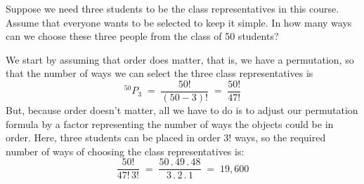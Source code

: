 \begin{figure}[htbp]\label{F:TwoAndThreeBlocksNorthEast}
\centering{}
\end{figure}


\begin{Exercise}[title={Choosing Volunteers},label={xChoose3of50}]
Suppose we need three students to be the class representatives in this course. 
Assume that everyone wants to be selected to keep it simple. 
In how many ways can we choose these three people from the class of 50 students? 
\end{Exercise}
\begin{Answer}
We start by assuming that order does matter, that is, we have a
permutation, so that the number of ways we can select the three class
representatives is
\[^{50}P_3\;=\; \frac{50!}{(50-3)!}\;=\; \frac{50!}{47!}\]
But, because order doesn't matter,  all we have to do is to adjust our
permutation formula by a factor representing the number of  ways the objects could be in
order. Here,  three students can  be placed in order $3!$ ways, so
the required number of  ways of choosing the class representatives is:
\[ \frac{50!}{47!\, 3!}\;=\;
\frac{50\,.\, 49\,.\,48}{3\,.\,2\,.\,1}\;=\; 19,600\]
\end{Answer}

